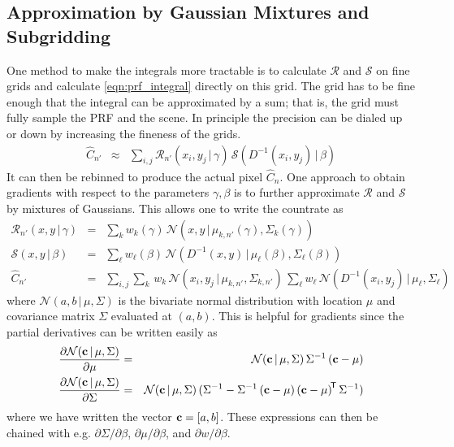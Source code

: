\documentclass[modern]{aastex6}
\newcommand{\transpose}[1]{{#1}^{\!\mathsf T}}
\newcommand{\given}{\,|\,}
\newcommand{\countrate}{\hat{C}}
\newcommand{\prf}{\mathcal{R}}
\newcommand{\scene}{\mathcal{S}}
\newcommand{\normal}{\mathcal{N}}
\begin{document}
\subsection{Approximation by Gaussian Mixtures and Subgridding}
One method to make the integrals more tractable is to calculate $\prf$ and $\scene$ on fine grids and calculate \ref{eqn:prf_integral} directly on this grid.
The grid has to be fine enough that the integral can be approximated by a sum; that is, the grid must fully sample the PRF and the scene.
In principle the precision can be dialed up or down by increasing the fineness of the grids.
\begin{eqnarray}
\label{eqn:prf_grid}
\countrate_{n'} & \approx & \sum_{i,j} \prf_{n'}(x_i, y_j \given \gamma) \, \scene( D^{-1}(x_i, y_j) \given \beta) \nonumber
\end{eqnarray}
It can then be rebinned to produce the actual pixel $\countrate_n$.
One approach to obtain gradients with respect to the parameters $\gamma, \beta$ is to further approximate $\prf$ and $\scene$ by mixtures of Gaussians.
This allows one to write the countrate as 
\begin{eqnarray}
\prf_{n'}(x, y \given \gamma)  & = & \sum_k w_k(\gamma) \, \normal(x, y \given \mu_{k, n'}(\gamma), \Sigma_k(\gamma)) \\
\scene(x, y \given \beta) & = & \sum_\ell w_\ell(\beta) \, \normal(D^{-1}(x, y) \given \mu_\ell(\beta), \Sigma_\ell(\beta)) \nonumber \\
\countrate_{n'} & = & \sum_{i,j}\sum_{k} \, w_k \, \normal(x_i, y_j \given \mu_{k, n'}, \Sigma_{k, n'}) \, \sum_\ell w_\ell \, \normal(D^{-1}(x_i, y_j) \given \mu_{\ell}, \Sigma_{\ell}) \nonumber
\end{eqnarray}
where $\normal(a, b \given \mu, \Sigma)$ is the bivariate normal distribution with location $\mu$ and covariance matrix $\Sigma$ evaluated at $(a, b)$.
This is helpful for gradients since the partial derivatives can be written easily as 
 \begin{eqnarray}
\frac{\partial\normal( {\bf c} \given \mu, \Sigma)}{\partial \mu}  & = &  \normal({\bf c} \given \mu, \Sigma) \, \Sigma^{-1} \, ({\bf c}-\mu)\\
\frac{\partial\normal( {\bf c} \given \mu, \Sigma)}{\partial \Sigma}  & = &  \normal({\bf c} \given \mu, \Sigma) \, (\Sigma^{-1} - \Sigma^{-1}\, ({\bf c}-\mu) \, \transpose{({\bf c}-\mu)}\, \Sigma^{-1}) \nonumber
\end{eqnarray}
where we have written the vector ${\bf c} = [a, b]$. 
These expressions can then be chained with e.g. $\partial \Sigma /\partial \beta$, $\partial \mu /\partial \beta$, and $\partial w/\partial \beta$.
\end{document}

